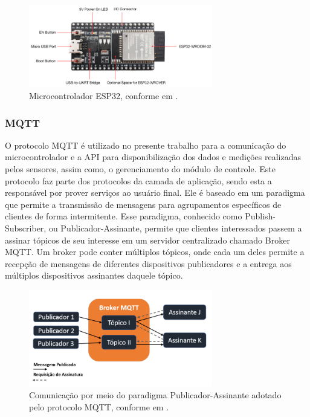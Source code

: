 \documentclass[conference]{IEEEtran}
\begin{document}
\begin{figure}
    \centering
    \includegraphics[width=8cm]{esp_32.png}
    \caption{Microcontrolador ESP32, conforme em \cite{b24}.}
    \label{fig:esp_32}
\end{figure}

\subsubsection{MQTT}
O protocolo MQTT é utilizado no presente trabalho para a comunicação do microcontrolador e a API para disponibilização dos dados e medições realizadas pelos sensores, assim como, o gerenciamento do módulo de controle. Este protocolo faz parte dos protocolos da camada de aplicação, sendo esta a responsável por prover serviços ao usuário final. Ele é baseado em um paradigma que permite a transmissão de mensagens para agrupamentos específicos de clientes de forma intermitente. Esse paradigma, conhecido como Publish-Subscriber, ou Publicador-Assinante, permite que clientes interessados passem a assinar tópicos de seu interesse em um servidor centralizado chamado Broker MQTT. Um broker pode conter múltiplos tópicos, onde cada um deles permite a recepção de mensagens de diferentes dispositivos publicadores e a entrega aos múltiplos dispositivos assinantes daquele tópico.\cite{b22}

\begin{figure}
    \centering
    \includegraphics[width=8cm]{broker_mqtt.png}
    \caption{Comunicação por meio do paradigma Publicador-Assinante adotado pelo protocolo MQTT, conforme em \cite{b22}.}
    \label{fig:broker_mqtt}
\end{figure}
\end{document}
